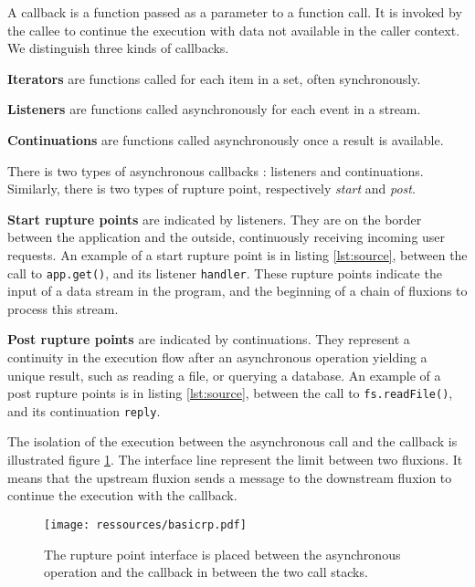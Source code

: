 A callback is a function passed as a parameter to a function call.
It is invoked by the callee to continue the execution with data not available in the caller context.
We distinguish three kinds of callbacks.

\textbf{Iterators} are functions called for each item in a set, often synchronously.

\textbf{Listeners} are functions called asynchronously for each event in a stream.

\textbf{Continuations} are functions called asynchronously once a result is available.

There is two types of asynchronous callbacks : listeners and continuations.
Similarly, there is two types of rupture point, respectively \textit{start} and \textit{post}.

\textbf{Start rupture points} are indicated by listeners. They are on the border between the application and the outside, continuously receiving incoming user requests.
An example of a start rupture point is in listing \ref{lst:source}, between the call to \texttt{app.get()}, and its listener \texttt{handler}.
These rupture points indicate the input of a data stream in the program, and the beginning of a chain of fluxions to process this stream.

\textbf{Post rupture points} are indicated by continuations.
They represent a continuity in the execution flow after an asynchronous operation yielding a unique result, such as reading a file, or querying a database.
An example of a post rupture points is in listing \ref{lst:source}, between the call to \texttt{fs.readFile()}, and its continuation \texttt{reply}.


The isolation of the execution between the asynchronous call and the callback is illustrated figure \ref{fig:basicrp}. The interface line represent the limit between two fluxions. It means that the upstream fluxion sends a message to the downstream fluxion to continue the execution with the callback.

\begin{figure}[h!]
\begin{center}
  \texttt{[image: ressources/basicrp.pdf]}
  \caption{The rupture point interface is placed between the asynchronous operation and the callback in between the two call stacks.}
  \label{fig:basicrp}
\end{center}
\end{figure}

